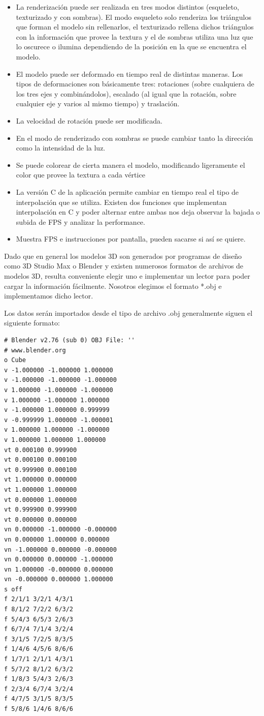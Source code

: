 \documentclass[a4paper]{article}
\newcounter{col}
\begin{document}
\begin{itemize}
\item La renderización puede ser realizada en tres modos distintos (esqueleto, texturizado y con sombras). El modo esqueleto solo renderiza los triángulos que forman el modelo sin rellenarlos, el texturizado rellena dichos triángulos con la información que provee la textura y el de sombras utiliza una luz que lo oscurece o ilumina dependiendo de la posición en la que se encuentra el modelo. 
\item El modelo puede ser deformado en tiempo real de distintas maneras. Los tipos de deformaciones son básicamente tres: rotaciones (sobre cualquiera de los tres ejes y combinándolos), escalado (al igual que la rotación, sobre cualquier eje y varios al mismo tiempo) y traslación. 
\item La velocidad de rotación puede ser modificada.
\item En el modo de renderizado con sombras se puede cambiar tanto la dirección como la intensidad de la luz.
\item Se puede colorear de cierta manera el modelo, modificando ligeramente el color que provee la textura a cada vértice
\item La versión C de la aplicación permite cambiar en tiempo real el tipo de interpolación que se utiliza. Existen dos funciones que implementan interpolación en C y poder alternar entre ambas nos deja observar la bajada o subida de FPS y analizar la performance.
\item Muestra FPS e instrucciones por pantalla, pueden sacarse si así se quiere.
\end{itemize} 

\par Dado que en general los modelos 3D son generados por programas de diseño como 3D Studio Max o Blender y existen numerosos formatos de archivos de modelos 3D, resulta conveniente elegir uno e implementar un lector para poder cargar la información fácilmente. Nosotros elegimos el formato *.obj e implementamos dicho lector.

Los datos serán importados desde el tipo de archivo .obj generalmente siguen el siguiente formato:  

\begin{verbatim}
# Blender v2.76 (sub 0) OBJ File: ''
# www.blender.org
o Cube
v -1.000000 -1.000000 1.000000
v -1.000000 -1.000000 -1.000000
v 1.000000 -1.000000 -1.000000
v 1.000000 -1.000000 1.000000
v -1.000000 1.000000 0.999999
v -0.999999 1.000000 -1.000001
v 1.000000 1.000000 -1.000000
v 1.000000 1.000000 1.000000
vt 0.000100 0.999900
vt 0.000100 0.000100
vt 0.999900 0.000100
vt 1.000000 0.000000
vt 1.000000 1.000000
vt 0.000000 1.000000
vt 0.999900 0.999900
vt 0.000000 0.000000
vn 0.000000 -1.000000 -0.000000
vn 0.000000 1.000000 0.000000
vn -1.000000 0.000000 -0.000000
vn 0.000000 0.000000 -1.000000
vn 1.000000 -0.000000 0.000000
vn -0.000000 0.000000 1.000000
s off
f 2/1/1 3/2/1 4/3/1
f 8/1/2 7/2/2 6/3/2
f 5/4/3 6/5/3 2/6/3
f 6/7/4 7/1/4 3/2/4
f 3/1/5 7/2/5 8/3/5
f 1/4/6 4/5/6 8/6/6
f 1/7/1 2/1/1 4/3/1
f 5/7/2 8/1/2 6/3/2
f 1/8/3 5/4/3 2/6/3
f 2/3/4 6/7/4 3/2/4
f 4/7/5 3/1/5 8/3/5
f 5/8/6 1/4/6 8/6/6
\end{verbatim} 
\end{document}
